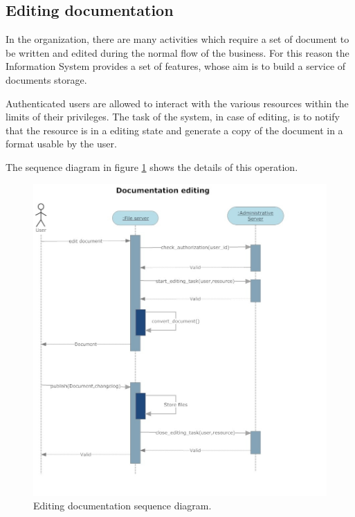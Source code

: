 \subsection{Editing documentation}
In the organization, there are many activities which require a set of
document to be written and edited during the normal flow of the business.
For this reason the Information System provides a set of features, whose
aim is to build a service of documents storage.

Authenticated users are allowed to interact with the various resources
within the limits of their privileges. The task of the system, in case of
editing, is to notify that the resource is in a editing state and generate
a copy of the document in a format usable by the user.

The sequence diagram in figure \ref{3img:[sequence]editing} shows the
details of this operation.

\begin{figure}[H]
\begin{centering}
\includegraphics[scale=0.45]{assign3/sdraw/imgs/editing.jpg}
\caption{Editing documentation sequence diagram.}
\label{3img:[sequence]editing}
\end{centering}
\end{figure}
